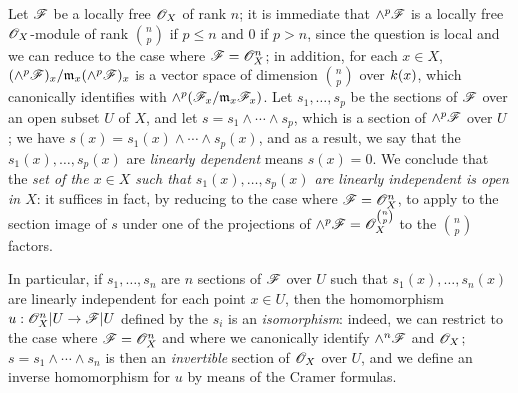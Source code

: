 \begin{env}[5.5.4]
\label{0.5.5.4}
Let $\mathscr{F}$ be a locally free $\mathscr{O}_X$ of rank $n$;
it is immediate that $\wedge^p\mathscr{F}$ is a locally free $\mathscr{O}_X$-module of rank $\binom{n}{p}$ if $p\leq n$ and $0$ if $p>n$, since the question is local and we can reduce to the case where $\mathscr{F}=\mathscr{O}_X^n$;
in addition, for each $x\in X$, $(\wedge^p\mathscr{F})_x/\mathfrak{m}_x(\wedge^p\mathscr{F})_x$ is a vector space of dimension $\binom{n}{p}$ over $k(x)$, which canonically identifies with $\wedge^p(\mathscr{F}_x/\mathfrak{m}_x\mathscr{F}_x)$.
Let $s_1,\dots,s_p$ be the sections of $\mathscr{F}$ over an open subset $U$ of $X$, and let $s=s_1\wedge\cdots\wedge s_p$, which is a section of $\wedge^p\mathscr{F}$ over $U$ ;
we have $s(x)=s_1(x)\wedge\cdots\wedge s_p(x)$, and as a result, we say that the $s_1(x),\dots,s_p(x)$ are \emph{linearly dependent} means $s(x)=0$.
We conclude that the \emph{set of the $x\in X$ such that $s_1(x),\dots,s_p(x)$ are linearly independent is open in $X$}: it suffices in fact, by reducing to the case where $\mathscr{F}=\mathscr{O}_X^n$, to apply  to the section image of $s$ under one of the projections of $\wedge^p\mathscr{F}=\mathscr{O}_X^{\binom{n}{p}}$ to the $\binom{n}{p}$ factors.

In particular, if $s_1,\dots,s_n$ are $n$ sections of $\mathscr{F}$ over $U$ such that $s_1(x),\dots,s_n(x)$ are linearly independent for each point $x\in U$, then the homomorphism $u:\sh{O}_X^n|U\to\sh{F}|U$ defined by the $s_i$  is an \emph{isomorphism}:
indeed, we can restrict to the case where $\mathscr{F}=\mathscr{O}_X^n$ and where we canonically identify $\wedge^n\mathscr{F}$ and $\mathscr{O}_X$;
$s=s_1\wedge\cdots\wedge s_n$ is then an \emph{invertible} section of $\mathscr{O}_X$ over $U$, and we define an inverse homomorphism for $u$ by means of the Cramer formulas.
\end{env}

